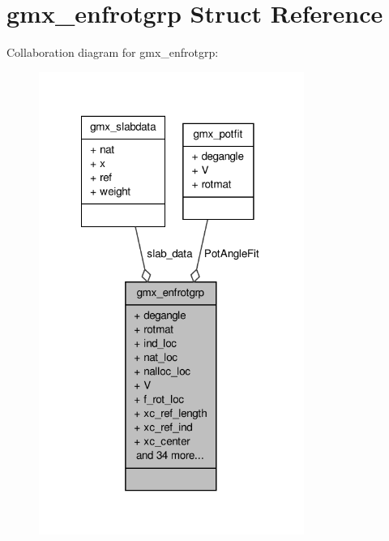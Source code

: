 \hypertarget{structgmx__enfrotgrp}{\section{gmx\-\_\-enfrotgrp \-Struct \-Reference}
\label{structgmx__enfrotgrp}
}


\-Collaboration diagram for gmx\-\_\-enfrotgrp\-:
\nopagebreak
\begin{figure}[H]
\begin{center}
\leavevmode
\includegraphics[width=245pt]{structgmx__enfrotgrp__coll__graph}
\end{center}
\end{figure}
